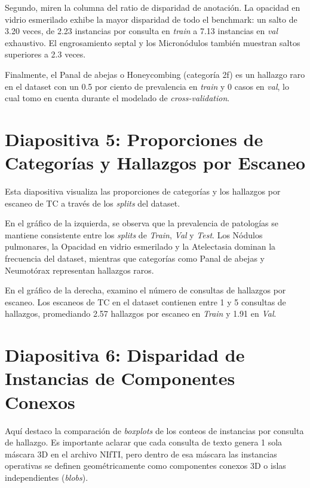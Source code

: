 \documentclass[11pt, a4paper]{article}
\begin{document}
Segundo, miren la columna del ratio de disparidad de anotación. La opacidad en vidrio esmerilado exhibe la mayor disparidad de todo el benchmark: un salto de 3.20 veces, de 2.23 instancias por consulta en \textit{train} a 7.13 instancias en \textit{val} exhaustivo. El engrosamiento septal y los Micronódulos también muestran saltos superiores a 2.3 veces.

Finalmente, el Panal de abejas o Honeycombing (categoría 2f) es un hallazgo raro en el dataset con un 0.5 por ciento de prevalencia en \textit{train} y 0 casos en \textit{val}, lo cual tomo en cuenta durante el modelado de \textit{cross-validation}.

\bigskip

\section{Diapositiva 5: Proporciones de Categorías y Hallazgos por Escaneo}

Esta diapositiva visualiza las proporciones de categorías y los hallazgos por escaneo de TC a través de los \textit{splits} del dataset.

En el gráfico de la izquierda, se observa que la prevalencia de patologías se mantiene consistente entre los \textit{splits} de \textit{Train}, \textit{Val} y \textit{Test}. Los Nódulos pulmonares, la Opacidad en vidrio esmerilado y la Atelectasia dominan la frecuencia del dataset, mientras que categorías como Panal de abejas y Neumotórax representan hallazgos raros.

En el gráfico de la derecha, examino el número de consultas de hallazgos por escaneo. Los escaneos de TC en el dataset contienen entre 1 y 5 consultas de hallazgos, promediando 2.57 hallazgos por escaneo en \textit{Train} y 1.91 en \textit{Val}.

\bigskip

\section{Diapositiva 6: Disparidad de Instancias de Componentes Conexos}

Aquí destaco la comparación de \textit{boxplots} de los conteos de instancias por consulta de hallazgo. Es importante aclarar que cada consulta de texto genera 1 sola máscara 3D en el archivo NIfTI, pero dentro de esa máscara las instancias operativas se definen geométricamente como componentes conexos 3D o islas independientes (\textit{blobs}).
\end{document}
